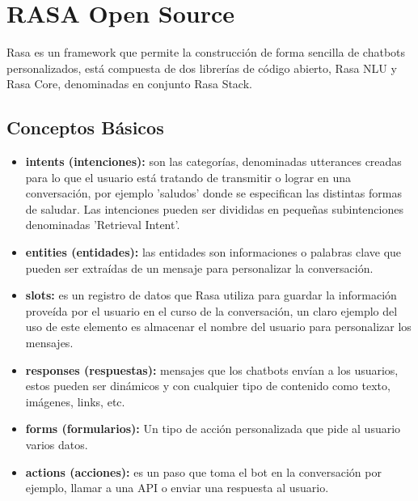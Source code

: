 \chapter[RASA]{RASA Open Source}
Rasa es un framework que permite la construcción de forma sencilla de chatbots personalizados, está
compuesta de dos librerías de código abierto, Rasa NLU y Rasa Core, denominadas en conjunto Rasa
Stack.
\indent
\section{Conceptos Básicos}
\begin{itemize}
	\item \textbf{intents (intenciones): }son las categorías, denominadas utterances creadas para
	      lo que el usuario está tratando de transmitir o lograr en una conversación, por ejemplo 'saludos'
	      donde se especifican las distintas formas de saludar. Las intenciones pueden ser divididas en
	      pequeñas subintenciones denominadas 'Retrieval Intent'.
	\item \textbf{entities (entidades): } las entidades son informaciones o palabras clave que
	      pueden ser extraídas de un mensaje para personalizar la conversación.
	\item \textbf{slots:} es un registro de datos que Rasa utiliza para guardar la información
	      proveída por el usuario en el curso de la conversación, un claro ejemplo del uso de este elemento
	      es almacenar el nombre del usuario para personalizar los mensajes.
	\item \textbf{responses (respuestas):} mensajes que los chatbots envían a los usuarios, estos
	      pueden ser dinámicos y con cualquier tipo de contenido como texto, imágenes, links, etc.
	\item \textbf{forms (formularios):} Un tipo de acción personalizada que pide al usuario varios
	      datos.
	\item \textbf{actions (acciones):} es un paso que toma el bot en la conversación por ejemplo,
	      llamar a una API o enviar una respuesta al usuario.\cite{Glossary}
\end{itemize}

